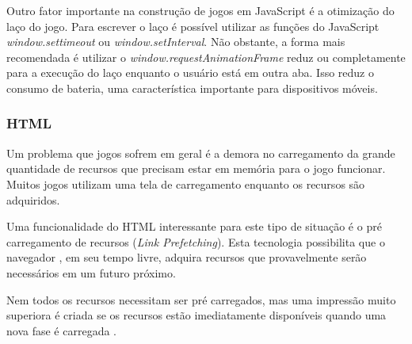 Outro fator importante na construção de jogos em JavaScript é a
otimização do laço do jogo. Para escrever o laço é possível
utilizar as funções do JavaScript \textit{window.settimeout} ou
\textit{window.setInterval}. Não obstante, a forma mais recomendada é
utilizar o \textit{window.requestAnimationFrame} reduz ou completamente
para a execução do laço enquanto o usuário está em outra aba.
Isso reduz o consumo de bateria, uma característica importante para
dispositivos móveis.

\subsubsection{HTML}

Um problema que jogos sofrem em geral é a demora no carregamento da
grande quantidade de recursos que precisam estar em memória para o jogo
funcionar. Muitos jogos utilizam uma tela de carregamento enquanto os 
recursos são adquiridos.

Uma funcionalidade do HTML interessante para este tipo de situação
é o pré carregamento de recursos (\textit{Link Prefetching}). Esta
tecnologia possibilita que o navegador , em seu tempo livre, adquira
recursos que provavelmente serão necessários em um futuro próximo.

Nem todos os recursos necessitam ser pré carregados, mas uma impressão
muito superiora é criada se os recursos estão imediatamente
disponíveis quando uma nova fase é carregada \autocite[pp. 39]{creatingFun}.

